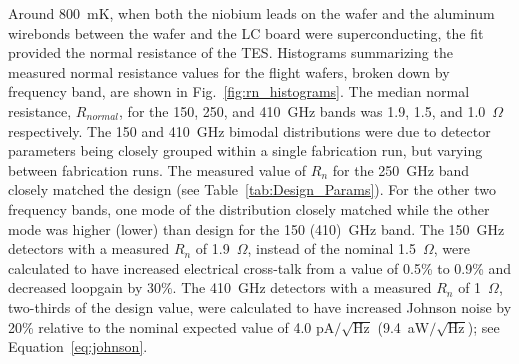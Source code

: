 Around 800~mK, when both the niobium leads on the wafer and the aluminum wirebonds between the wafer and the \ac{LC} board were superconducting, the fit provided the normal resistance of the \ac{TES}. 
Histograms summarizing the measured normal resistance values for the flight wafers, broken down by frequency band, are shown in Fig.~\ref{fig:rn_histograms}. 
The median normal resistance, $R_{normal}$, for the 150, 250, and 410~GHz bands was 1.9, 1.5, and 1.0~$\Omega$ respectively. 
The 150 and 410~GHz bimodal distributions were due to detector parameters being closely grouped within a single fabrication run, but varying between fabrication runs. 
The measured value of $R_{n}$ for the 250~GHz band closely matched the design (see 
Table~\ref{tab:Design_Params}). 
For the other two frequency bands, one mode of the distribution closely matched while the other mode was higher (lower) than design for the 150 (410)~GHz band. 
The 150~GHz detectors with a measured $R_{n}$ of 1.9~$\Omega$, instead of the nominal 1.5~$\Omega$, were calculated to have increased electrical cross-talk from a value of 0.5\% to 0.9\% and decreased loopgain by 30\%. 
The 410~GHz detectors with a measured $R_{n}$ of 1~$\Omega$, two-thirds of the design value, were calculated to have increased Johnson noise by 20\% relative to the nominal expected value of 4.0 pA$/\sqrt{\mathrm{Hz}}$ (9.4~aW$/\sqrt{\mathrm{Hz}}$); see Equation~\ref{eq:johnson}.

